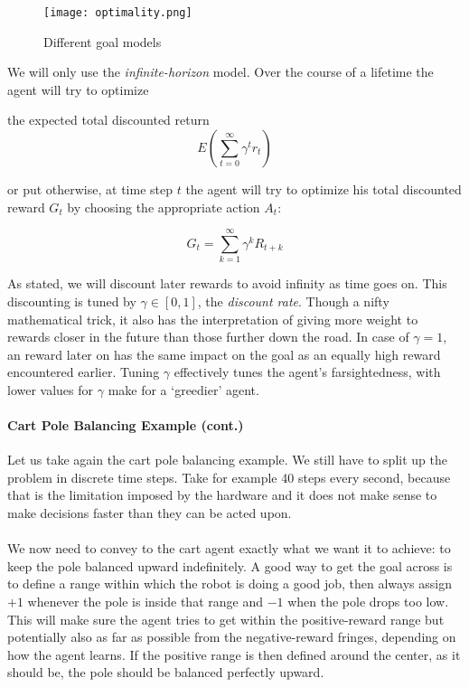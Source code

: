 \begin{figure}[t]
  \centering
  \texttt{[image: optimality.png]}
  \caption[Goal models]{
    Different goal models
    \parencite{Kaelbling1996}
  }
  \label{fig:optimality}
\end{figure}

We will only use the \textit{infinite-horizon} model.
Over the course of a lifetime
the agent will try to optimize

the expected total discounted return
\begin{equation}
  E\left( \sum^{\infty}_{t=0}\gamma^tr_t \right)
\end{equation}

or put otherwise,
at time step $t$ the agent will try to optimize his
total discounted reward $G_t$
by choosing the appropriate action $A_t$:


\begin{equation}
  G_t = \sum^{\infty}_{k=1}\gamma^kR_{t+k}
\end{equation}

As stated, we will discount later rewards
to avoid infinity as time goes on.
This discounting is tuned by $\gamma \in [0,1]$,
the \textit{discount rate}.
Though a nifty mathematical trick,
it also has the interpretation of giving more weight
to rewards closer in the future than those
further down the road.
In case of $\gamma = 1$,
an reward later on has the same impact on the goal as an equally high reward
encountered earlier.
Tuning $\gamma$ effectively tunes the agent's
farsightedness, with lower values for $\gamma$
make for a `greedier' agent.

\paragraph{Cart Pole Balancing Example (cont.)}
Let us take again the cart pole balancing example.
We still have to split up the problem in discrete time steps.
Take for example 40 steps every second,
because that is the limitation imposed by the hardware
and it does not make sense to make decisions faster
than they can be acted upon.

\paragraph{}
We now need to convey to the cart agent exactly
what we want it to achieve:
to keep the pole balanced upward indefinitely.
A good way to get the goal across is to define a range
within which the robot is doing a good job,
then always assign $+1$ whenever the pole is inside that range
and $-1$ when the pole drops too low.
This will make sure the agent tries to get
within the positive-reward range
but potentially also as far as possible
from the negative-reward fringes,
depending on how the agent learns.
If the positive range is then defined around the center,
as it should be,
the pole should be balanced perfectly upward.


